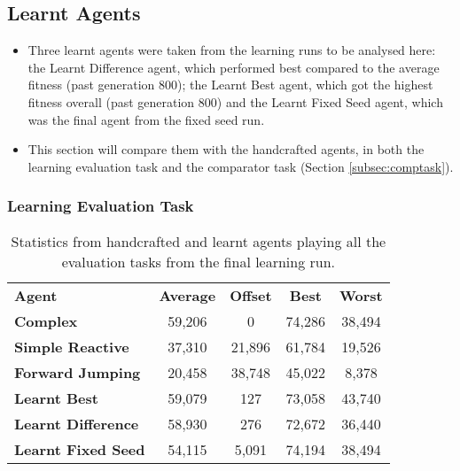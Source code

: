 \clearpage

\subsection{Learnt Agents}
\label{subsec:evallearnt}

\begin{itemize}
\item Three learnt agents were taken from the learning runs to be analysed here: the Learnt Difference agent, which performed best compared to the average fitness (past generation 800); the Learnt Best agent, which got the highest fitness overall (past generation 800) and the Learnt Fixed Seed agent, which was the final agent from the fixed seed run.
\item This section will compare them with the handcrafted agents, in both the learning evaluation task and the comparator task (Section \ref{subsec:comptask}).
\end{itemize}

\subsubsection{Learning Evaluation Task}

\begin{table}
  \begin{adjustwidth}{-0cm}{-0cm}
  \begin{center} \small
    \begin{tabular}{ | l | c | c | c | c |}
    \hline
    \textbf{Agent} & \textbf{Average} & \textbf{Offset} & \textbf{Best} & \textbf{Worst} \TBstrut \\ \thickhline
    \textbf{Complex} & 59,206 & 0 & 74,286 & 38,494  \\ \hline
    \textbf{Simple Reactive} & 37,310 & 21,896 & 61,784 & 19,526 \\ \hline
    \textbf{Forward Jumping} & 20,458 & 38,748 & 45,022 & 8,378 \\ \thickhline
    \textbf{Learnt Best} & 59,079 & 127 & 73,058 & 43,740  \\ \hline
    \textbf{Learnt Difference} & 58,930 & 276 & 72,672 & 36,440  \\ \hline
    \textbf{Learnt Fixed Seed} & 54,115 & 5,091 & 74,194 & 38,494  \\ \hline
    \end{tabular}
  \end{center}
  \end{adjustwidth}
  \caption{\small Statistics from handcrafted and learnt agents playing all the evaluation tasks from the final learning run.}
  \label{tab:learnrunagents}
\end{table}

